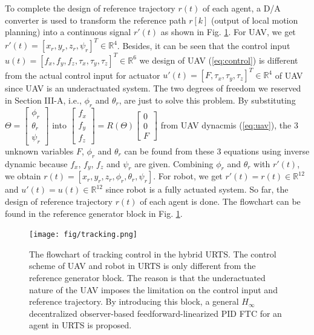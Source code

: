 \documentclass{ieeeaccess}
\begin{document}
To complete the design of reference trajectory $r(t)$ of each agent, a D/A converter is used to transform the reference path $r[k]$ (output of local motion planning) into a continuous signal $r'(t)$ as shown in Fig. \ref{fig:tracking}. For UAV, we get $r'(t) = [x_r, y_r, z_r, \psi_r]^T\in\mathbb{R}^{4}$. Besides, it can be seen that the control input $u(t)=[f_x, f_y, f_z, \tau_x, \tau_y, \tau_z]^T\in\mathbb{R}^6$ we design of UAV (\ref{eq:control}) is different from the actual control input for actuator $u'(t)=[F, \tau_x, \tau_y, \tau_z]^T\in\mathbb{R}^4$ of UAV since UAV is an underactuated system. The two degrees of freedom we reserved in Section III-A, i.e., $\phi_r$ and $\theta_r$, are just to solve this problem. By substituting $\Theta=\begin{bmatrix}
    \phi_r \\ \theta_r \\ \psi_r
\end{bmatrix}$ into $\begin{bmatrix}
        f_x \\ f_y \\ f_z
\end{bmatrix} = R(\Theta)\begin{bmatrix}
        0 \\ 0 \\ F
\end{bmatrix} $ from UAV dynacmis (\ref{eq:uav}), the 3 unknown variables $F$, $\phi_r$ and $\theta_r$ can be found from these 3 equations using inverse dynamic because $f_x$, $f_y$, $f_z$ and $\psi_r$ are given. Combining $\phi_r$ and $\theta_r$ with $r'(t)$, we obtain $r(t)= [x_r, y_r, z_r, \phi_r, \theta_r, \psi_r]$. For robot, we get $r'(t)=r(t)\in\mathbb{R}^{12}$ and $u'(t)=u(t)\in\mathbb{R}^{12}$ since robot is a fully actuated system. So far, the design of reference trajectory $r(t)$ of each agent is done. The flowchart can be found in the reference generator block in Fig. \ref{fig:tracking}.
\begin{figure}[htbp]
    \centering
    \texttt{[image: fig/tracking.png]}\caption{The flowchart of tracking control in the hybrid URTS. The control scheme of UAV and robot in URTS is only different from the reference generator block. The reason is that the underactuated nature of the UAV imposes the limitation on the control input and reference trajectory. By introducing this block, a general $H_\infty$ decentralized observer-based feedforward-linearized PID FTC for an agent in URTS is proposed.}
    \label{fig:tracking}
\end{figure}
\end{document}
